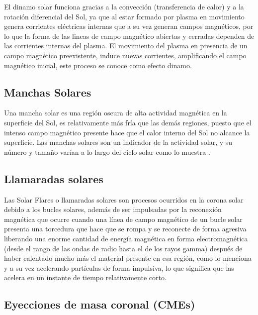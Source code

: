 El dinamo solar funciona gracias a la convección (transferencia de calor) y a la rotación diferencial del Sol, ya que al estar formado por plasma en movimiento genera corrientes eléctricas internas que a su vez generan campos magnéticos, por lo que la forma de las lineas de campo magnético abiertas y cerradas dependen de las corrientes internas del plasma. El movimiento del plasma en presencia de un campo magnético preexistente, induce nuevas corrientes, amplificando el campo magnético inicial, este proceso se conoce como efecto dinamo.


\subsection{Manchas Solares}
Una mancha solar es una región oscura de alta actividad magnética en la superficie del Sol, es relativamente más fría que las demás regiones, puesto que el intenso campo magnético presente hace que el calor interno del Sol no alcance la superficie. Las manchas solares son un indicador de la actividad solar, y su número y tamaño varían a lo largo del ciclo solar como lo muestra \cite[e.g.,][]{hathaway-2015}.

\subsection{Llamaradas solares}
Las Solar Flares o llamaradas solares son procesos ocurridos en la corona solar debido a los bucles solares, además de ser impulsadas por la reconexión magnética que ocurre cuando una línea de campo magnético de un bucle solar presenta una torcedura que hace que se rompa y se reconecte de forma agresiva liberando una enorme cantidad de energía magnética en forma electromagnética (desde el rango de las ondas de radio hasta el de los rayos gamma) después
de haber calentado mucho más el material presente en esa región, como lo menciona \cite[e.g.,][]{SolarFlares} y a su vez acelerando partículas de forma impulsiva, lo que significa que las acelera en un instante de tiempo relativamente corto.

\subsection{Eyecciones de masa coronal (CMEs)}


